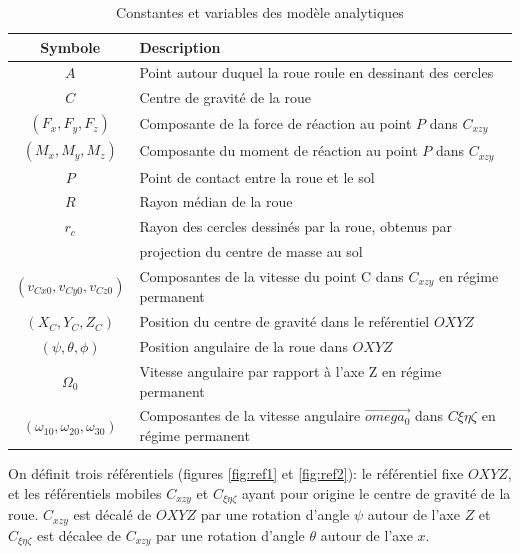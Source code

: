 \begin{table}[htbp]
  \centering
  \caption{Constantes et variables des modèle analytiques}
  \begin{tabular}{|c|l|}
    \hline\rowcolor[gray]{0.8}\color{black}
    Symbole         & Description\\\hline
    
    $A$             & Point autour duquel la roue roule en dessinant des cercles\\
    $C$             & Centre de gravité de la roue\\
    $(F_x,F_y,F_z)$          & Composante de la force de réaction au point $P$ dans $C_{xzy}$ \\
    $(M_x,M_y,M_z)$          & Composante du moment de réaction au point $P$ dans $C_{xzy}$ \\
    $P$             & Point de contact entre la roue et le sol\\
    $R$             & Rayon médian de la roue\\
    $r_c$             & Rayon des cercles dessinés par la roue, obtenus par\\
    & projection du centre de masse au sol\\
    $(v_{Cx0},v_{Cy0},v_{Cz0})$           & Composantes de la vitesse du point C dans $C_{xzy}$ en régime permanent \\
    $(X_C,Y_C,Z_C)$           & Position du centre de gravité dans le reférentiel $OXYZ$\\
    $(\psi,\theta,\phi)$       & Position angulaire de la roue dans $OXYZ$\\
    
    $\Omega_0$          & Vitesse angulaire par rapport à l'axe Z en régime permanent\\
    $(\omega_{10},\omega_{20},\omega_{30})$          & Composantes de la vitesse angulaire $\vec{omega_0}$ dans $C{\xi \eta \zeta}$ en régime permanent\\\hline
    
    
  \end{tabular}
  \label{tab:batista}
\end{table}

On définit trois référentiels (figures \ref{fig:ref1} et \ref{fig:ref2}): le référentiel fixe  $OXYZ$, et les référentiels mobiles $C_{xzy}$ et $C_{\xi\eta\zeta}$ ayant pour origine le centre de gravité de la roue. $C_{xzy}$ est décalé de $OXYZ$ par une rotation d'angle $\psi$ autour de l'axe $Z$ et $C_{\xi\eta\zeta}$ est décalee de $C_{xzy}$ par une rotation d'angle $\theta$ autour de l'axe $x$.

